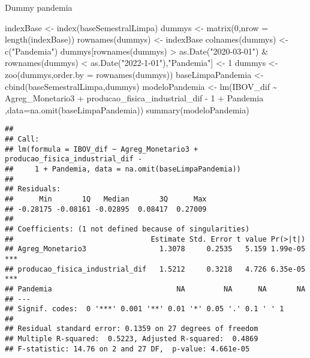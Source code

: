 \documentclass[
]{article}
\newenvironment{Shaded}{\begin{snugshade}}{\end{snugshade}}
\newcommand{\AttributeTok}[1]{\textcolor[rgb]{0.77,0.63,0.00}{#1}}
\newcommand{\DecValTok}[1]{\textcolor[rgb]{0.00,0.00,0.81}{#1}}
\newcommand{\FunctionTok}[1]{\textcolor[rgb]{0.00,0.00,0.00}{#1}}
\newcommand{\NormalTok}[1]{#1}
\newcommand{\OtherTok}[1]{\textcolor[rgb]{0.56,0.35,0.01}{#1}}
\newcommand{\SpecialCharTok}[1]{\textcolor[rgb]{0.00,0.00,0.00}{#1}}
\newcommand{\StringTok}[1]{\textcolor[rgb]{0.31,0.60,0.02}{#1}}
\begin{document}
Dummy pandemia

\begin{Shaded}
\begin{Highlighting}[]
\NormalTok{indexBase }\OtherTok{\textless{}{-}} \FunctionTok{index}\NormalTok{(baseSemestralLimpa)}
\NormalTok{dummys }\OtherTok{\textless{}{-}} \FunctionTok{matrix}\NormalTok{(}\DecValTok{0}\NormalTok{,}\AttributeTok{nrow =} \FunctionTok{length}\NormalTok{(indexBase))}
\FunctionTok{rownames}\NormalTok{(dummys) }\OtherTok{\textless{}{-}}\NormalTok{ indexBase}
\FunctionTok{colnames}\NormalTok{(dummys) }\OtherTok{\textless{}{-}} \FunctionTok{c}\NormalTok{(}\StringTok{"Pandemia"}\NormalTok{)}
\NormalTok{dummys[}\FunctionTok{rownames}\NormalTok{(dummys) }\SpecialCharTok{\textgreater{}} \FunctionTok{as.Date}\NormalTok{(}\StringTok{"2020{-}03{-}01"}\NormalTok{) }\SpecialCharTok{\&} \FunctionTok{rownames}\NormalTok{(dummys) }\SpecialCharTok{\textless{}} \FunctionTok{as.Date}\NormalTok{(}\StringTok{"2022{-}1{-}01"}\NormalTok{),}\StringTok{"Pandemia"}\NormalTok{] }\OtherTok{\textless{}{-}} \DecValTok{1}
\NormalTok{dummys }\OtherTok{\textless{}{-}} \FunctionTok{zoo}\NormalTok{(dummys,}\AttributeTok{order.by =} \FunctionTok{rownames}\NormalTok{(dummys))}
\NormalTok{baseLimpaPandemia }\OtherTok{\textless{}{-}} \FunctionTok{cbind}\NormalTok{(baseSemestralLimpa,dummys)}
\NormalTok{modeloPandemia }\OtherTok{\textless{}{-}} \FunctionTok{lm}\NormalTok{(IBOV\_dif }\SpecialCharTok{\textasciitilde{}}\NormalTok{ Agreg\_Monetario3 }\SpecialCharTok{+}\NormalTok{ producao\_fisica\_industrial\_dif  }\SpecialCharTok{{-}} \DecValTok{1} \SpecialCharTok{+}\NormalTok{ Pandemia}
\NormalTok{  ,}\AttributeTok{data=}\FunctionTok{na.omit}\NormalTok{(baseLimpaPandemia))}
\FunctionTok{summary}\NormalTok{(modeloPandemia)}
\end{Highlighting}
\end{Shaded}

\begin{verbatim}
## 
## Call:
## lm(formula = IBOV_dif ~ Agreg_Monetario3 + producao_fisica_industrial_dif - 
##     1 + Pandemia, data = na.omit(baseLimpaPandemia))
## 
## Residuals:
##      Min       1Q   Median       3Q      Max 
## -0.28175 -0.08161 -0.02895  0.08417  0.27009 
## 
## Coefficients: (1 not defined because of singularities)
##                                Estimate Std. Error t value Pr(>|t|)    
## Agreg_Monetario3                 1.3078     0.2535   5.159 1.99e-05 ***
## producao_fisica_industrial_dif   1.5212     0.3218   4.726 6.35e-05 ***
## Pandemia                             NA         NA      NA       NA    
## ---
## Signif. codes:  0 '***' 0.001 '**' 0.01 '*' 0.05 '.' 0.1 ' ' 1
## 
## Residual standard error: 0.1359 on 27 degrees of freedom
## Multiple R-squared:  0.5223, Adjusted R-squared:  0.4869 
## F-statistic: 14.76 on 2 and 27 DF,  p-value: 4.661e-05
\end{verbatim}
\end{document}
